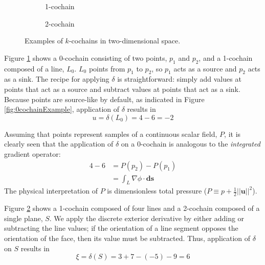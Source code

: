 \begin{figure}[ht]
\begin{subfigure}[c]{0.3\textwidth}
{
            \vfill
        }
        \caption{1-cochain}
        \label{fig:1cochainExample}
    \end{subfigure}
    \begin{subfigure}[c]{0.3\textwidth}
        \centering
        \usebox{\boxExample}
        \caption{2-cochain}
        \label{fig:2cochainExample}
    \end{subfigure}
    \caption{Examples of $k$-cochains in two-dimensional space.}
    \label{fig:cochainExamples}
\end{figure}

Figure \ref{fig:1cochainExample} shows a 0-cochain consisting of two points, $p_1$ and $p_2$, and a 1-cochain composed of a line, $L_0$. $L_0$ points from $p_1$ to $p_2$, so $p_1$ acts as a source and $p_2$ acts as a sink. The recipe for applying $\delta$ is straightforward: simply add values at points that act as a source and subtract values at points that act as a sink. Because points are source-like by default, as indicated in Figure \ref{fig:0cochainExample}, application of $\delta$ results in
\begin{equation}
    u = \delta(L_0) = 4 - 6 = -2
\end{equation}

Assuming that points represent samples of a continuous scalar field, $P$, it is clearly seen that the application of $\delta$ on a 0-cochain is analogous to the \emph{integrated} gradient operator:
\begin{equation}
    \begin{split}
        4 - 6 &= P(p_2) - P(p_1) \\
        &= \int_{L} \nabla \phi \cdot \mathbf{ds}
    \end{split}
\end{equation}
The physical interpretation of $P$ is dimensionless total pressure ($P \equiv p + \frac{1}{2}||\mathbf{u}||^2$).

Figure \ref{fig:2cochainExample} shows a 1-cochain composed of four lines and a 2-cochain composed of a single plane, $S$. We apply the discrete exterior derivative by either adding or subtracting the line values; if the orientation of a line segment opposes the orientation of the face, then its value must be subtracted. Thus, application of $\delta$ on $S$ results in\begin{equation}
    \xi = \delta(S) = 3 + 7 - (-5) - 9 = 6
\end{equation}

